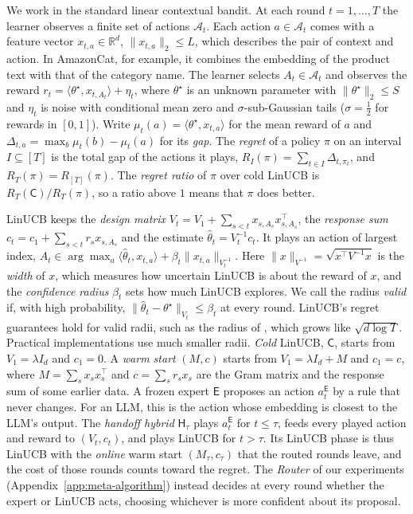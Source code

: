 \documentclass[anon]{alt2027} %
\newif\ifrevmarks\revmarkstrue
\newenvironment{revised}{\ifrevmarks\color{revcolor}\fi}{}
\newcommand{\R}{\mathbb{R}}
\newcommand{\Cold}{\mathsf{C}}
\newcommand{\Exp}{\mathsf{E}}
\newcommand{\Hyb}{\mathsf{H}}
\begin{document}
\begin{revised}
We work in the standard linear contextual bandit. At each round
$t=1,\dots,T$ the learner observes a finite set of actions $\mathcal A_t$.
Each action $a\in\mathcal A_t$ comes with a feature vector
$x_{t,a}\in\R^d$, $\|x_{t,a}\|_2\le L$, which describes the pair of context
and action. In AmazonCat, for example, it combines the embedding of the
product text with that of the category name. The learner selects
$A_t\in\mathcal A_t$ and observes the reward
$r_t=\langle\theta^\star,x_{t,A_t}\rangle+\eta_t$, where $\theta^\star$ is
an unknown parameter with $\|\theta^\star\|_2\le S$ and $\eta_t$ is noise
with conditional mean zero and $\sigma$-sub-Gaussian tails ($\sigma=\frac12$
for rewards in $[0,1]$). Write $\mu_t(a)=\langle\theta^\star,x_{t,a}\rangle$
for the mean reward of $a$ and $\Delta_{t,a}=\max_b\mu_t(b)-\mu_t(a)$ for
its \emph{gap}. The \emph{regret} of a policy $\pi$ on an interval
$I\subseteq[T]$ is the total gap of the actions it plays,
$R_I(\pi)=\sum_{t\in I}\Delta_{t,\pi_t}$, and $R_T(\pi)=R_{[T]}(\pi)$. The
\emph{regret ratio} of $\pi$ over cold LinUCB is $R_T(\Cold)/R_T(\pi)$, so a
ratio above $1$ means that $\pi$ does better.
\end{revised}

\begin{revised}
LinUCB keeps the \emph{design matrix}
$V_t=V_1+\sum_{s<t}x_{s,A_s}x_{s,A_s}^\top$, the \emph{response sum}
$c_t=c_1+\sum_{s<t}r_sx_{s,A_s}$ and the estimate
$\widehat\theta_t=V_t^{-1}c_t$. It plays an action of largest index,
$A_t\in\arg\max_a\langle\widehat\theta_t,x_{t,a}\rangle+\beta_t\|x_{t,a}\|_{V_t^{-1}}$.
Here $\|x\|_{V^{-1}}=\sqrt{x^\top V^{-1}x}$ is the \emph{width} of $x$,
which measures how uncertain LinUCB is about the reward of $x$, and the
\emph{confidence radius} $\beta_t$ sets how much LinUCB explores. We call the
radius \emph{valid} if, with high probability,
$\|\widehat\theta_t-\theta^\star\|_{V_t}\le\beta_t$ at every round. LinUCB's
regret guarantees hold for valid radii, such as the radius of
\citet{abbasi2011improved}, which grows like $\sqrt{d\log T}$. Practical
implementations use much smaller radii. \emph{Cold} LinUCB, $\Cold$, starts
from $V_1=\lambda I_d$ and $c_1=0$. A \emph{warm start} $(M,c)$ starts from
$V_1=\lambda I_d+M$ and $c_1=c$, where $M=\sum_sx_sx_s^\top$ and
$c=\sum_sr_sx_s$ are the Gram matrix and the response sum of some earlier
data. A frozen expert $\Exp$ proposes an action $a_t^{\Exp}$ by a rule that
never changes. For an LLM, this is the action whose embedding is closest to
the LLM's output. The \emph{handoff hybrid} $\Hyb_\tau$ plays $a_t^{\Exp}$
for $t\le\tau$, feeds every played action and reward to $(V_t,c_t)$, and
plays LinUCB for $t>\tau$. Its LinUCB phase is thus LinUCB with the
\emph{online} warm start $(M_\tau,c_\tau)$ that the routed rounds leave, and
the cost of those rounds counts toward the regret. The \emph{Router} of our
experiments (Appendix~\ref{app:meta-algorithm}) instead decides at every
round whether the expert or LinUCB acts, choosing whichever is more
confident about its proposal.
\end{revised}
\end{document}
